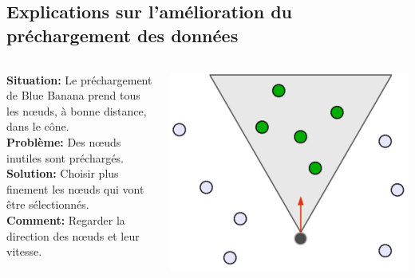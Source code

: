 \documentclass{beamer}
\begin{document}
  \subsection{Explications sur l'amélioration du préchargement des données}
  \begin{frame}
	\begin{columns}
        \begin{column}{7cm}
	\textbf{Situation:} Le préchargement de Blue Banana prend tous les nœuds, à bonne distance, dans le cône.\\
	\vspace{5mm}
	\textbf{Problème:} Des nœuds inutiles sont préchargés.\\
	\vspace{5mm}
	\textbf{Solution:} Choisir plus finement les nœuds qui vont être sélectionnés.\\
	\vspace{5mm}
	\textbf{Comment:} Regarder la direction des nœuds et leur vitesse.\\
         \end{column}
         \begin{column}{3cm}
          \includegraphics[scale=0.1]{./Ressources/Images/prefetchNormal.png}\\
         \end{column}
        \end{columns}
  \end{frame}
\end{document}
